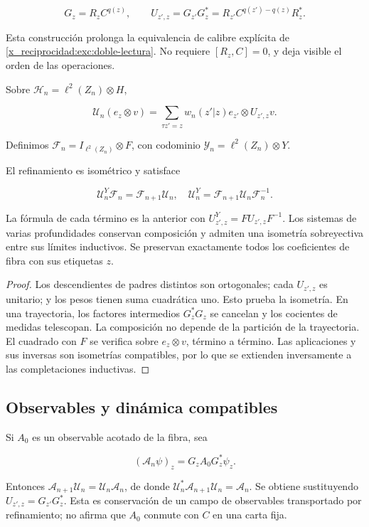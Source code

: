 \[
G_z=R_zC^{q(z)},\qquad
U_{z',z}=G_{z'}G_z^*
=R_{z'}C^{q(z')-q(z)}R_z^*.
\]

Esta construcción prolonga la equivalencia de calibre explícita de \cref{x_reciprocidad:exc:doble-lectura}. No requiere \([R_z,C]=0\), y deja visible el orden de las operaciones.

Sobre \(\mathscr H_n=\ell^2(Z_n)\otimes H\),

\[
\mathscr U_n(e_z\otimes v)
=\sum_{\tau z'=z}w_n(z'|z)e_{z'}\otimes U_{z',z}v.
\]

Definimos \(\mathscr F_n=I_{\ell^2(Z_n)}\otimes F\), con codominio \(\mathscr Y_n=\ell^2(Z_n)\otimes Y\).

\begin{theorem}
El refinamiento es isométrico y satisface

\[
\mathscr U^Y_n\mathscr F_n=\mathscr F_{n+1}\mathscr U_n,
\quad
\mathscr U^Y_n=\mathscr F_{n+1}\mathscr U_n\mathscr F_n^{-1}.
\]

La fórmula de cada término es la anterior con \(U^Y_{z',z}=FU_{z',z}F^{-1}\). Los sistemas de varias profundidades conservan composición y admiten una isometría sobreyectiva entre sus límites inductivos. Se preservan exactamente todos los coeficientes de fibra con sus etiquetas \(z\).
\end{theorem}

\begin{proof}
Los descendientes de padres distintos son ortogonales; cada \(U_{z',z}\) es unitario; y los pesos tienen suma cuadrática uno. Esto prueba la isometría. En una trayectoria, los factores intermedios \(G_z^*G_z\) se cancelan y los cocientes de medidas telescopan. La composición no depende de la partición de la trayectoria. El cuadrado con \(F\) se verifica sobre \(e_z\otimes v\), término a término. Las aplicaciones y sus inversas son isometrías compatibles, por lo que se extienden inversamente a las completaciones inductivas.
\end{proof}

\subsection{Observables y dinámica compatibles}

Si \(A_0\) es un observable acotado de la fibra, sea

\[
(\mathscr A_n\psi)_z=G_zA_0G_z^*\psi_z.
\]

Entonces \(\mathscr A_{n+1}\mathscr U_n=\mathscr U_n\mathscr A_n\), de donde \(\mathscr U_n^*\mathscr A_{n+1}\mathscr U_n=\mathscr A_n\). Se obtiene sustituyendo \(U_{z',z}=G_{z'}G_z^*\). Esta es conservación de un campo de observables transportado por refinamiento; no afirma que \(A_0\) conmute con \(C\) en una carta fija.

